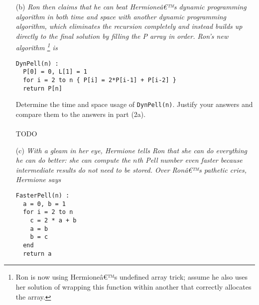 \documentclass[11pt]{article} \setlength{\oddsidemargin}{0in}
\begin{document}
{\begin{enumerate}
\begin{verbatim}
MemPell(n) {
  if n == 0 { return 0 } else if n == 1 { return 1 }
  else {
    if (P[n] == undefined) { P[n] = 2*MemPell(n-1) + MemPell(n-2) }
    return P[n]
  }
}
\end{verbatim}

    \begin{enumerate}
    \item[i.] \textit{Describe the behavior of \texttt{MemPell(n)} in
        terms of a traversal of a computation tree. Describe how the
        array \texttt{P} is filled.}
    \item[ii.] \textit{Determine the asymptotic running time of
        \texttt{MemPell}. Prove your claim is correct by induction on
        the contents of the array.}
    \end{enumerate}
    TODO
    \\
  \item[(b)] \textit{Ron then claims that he can beat Hermioneâ€™s
      dynamic programming algorithm in both time and space with
      another dynamic programming algorithm, which eliminates the
      recursion completely and instead builds up directly to the final
      solution by filling the P array in order. Ron's new algorithm
      \footnote{Ron is now using Hermioneâ€™s undefined array trick;
        assume he also uses her solution of wrapping this function
        within another that correctly allocates the array.} is}

\begin{verbatim}
DynPell(n) :
  P[0] = 0, L[1] = 1
  for i = 2 to n { P[i] = 2*P[i-1] + P[i-2] }
  return P[n]
\end{verbatim}

    Determine the time and space usage of \texttt{DynPell(n)}. Justify
    your answers and compare them to the answers in part (2a).
    \\\\
    TODO
    \\
  \item[(c)] \textit{With a gleam in her eye, Hermione tells Ron that
      she can do everything he can do better: she can compute the
      $n$th Pell number even faster because intermediate results do
      not need to be stored. Over Ronâ€™s pathetic cries, Hermione says}

\begin{verbatim}
FasterPell(n) :
  a = 0, b = 1
  for i = 2 to n
    c = 2 * a + b
    a = b
    b = c
  end
  return a
\end{verbatim}


\end{enumerate}}
\end{document}
